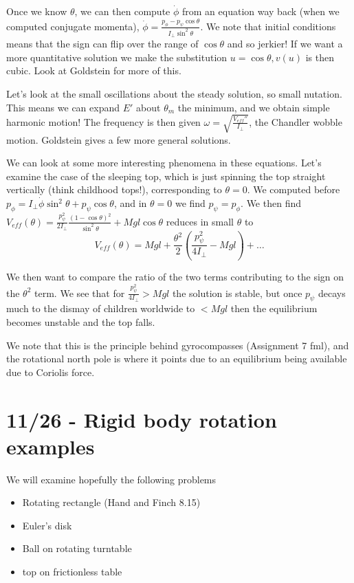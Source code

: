 \documentclass[10pt]{report}
\begin{document}
Once we know $\theta$, we can then compute $\dot{\phi}$ from an equation way back (when we computed conjugate momenta), $\dot{\phi} = \frac{p_\phi - p_\psi\cos \theta}{I_{\perp}\sin^2\theta}$. We note that initial conditions means that the sign can flip over the range of $\cos \theta$ and so jerkier! If we want a more quantitative solution we make the substitution $u = \cos \theta, v(u)$ is then cubic. Look at Goldstein for more of this.

Let's look at the small oscillations about the steady solution, so small nutation. This means we can expand $E'$ about $\theta_m$ the minimum, and we obtain simple harmonic motion! The frequency is then given $\omega = \sqrt{\frac{V_{eff}''}{I_\perp}}$, the Chandler wobble motion. Goldstein gives a few more general solutions.

We can look at some more interesting phenomena in these equations. Let's examine the case of the sleeping top, which is just spinning the top straight vertically (think childhood tops!), corresponding to $\theta = 0$. We computed before $p_\phi = I_\perp \dot{\phi}\sin^2\theta + p_\psi\cos \theta$, and in $\theta = 0$ we find $p_\psi = p_\phi$. We then find $V_{eff}(\theta) = \frac{p_\psi^2}{2I_{\perp}}\frac{(1-\cos\theta)^2}{\sin^2\theta} + Mgl\cos \theta$ reduces in small $\theta$ to
$$V_{eff}(\theta) = Mgl + \frac{\theta^2}{2}\left( \frac{p_\psi^2}{4I_\perp} - Mgl \right) +\dots$$

We then want to compare the ratio of the two terms contributing to the sign on the $\theta^2$ term. We see that for $\frac{p_\psi^2}{4I_\perp} > Mgl$ the solution is stable, but once $p_\psi$ decays much to the dismay of children worldwide to $< Mgl$ then the equilibrium becomes unstable and the top falls. 

We note that this is the principle behind gyrocompasses (Assignment 7 fml), and the rotational north pole is where it points due to an equilibrium being available due to Coriolis force. 

\chapter{11/26 - Rigid body rotation examples}

We will examine hopefully the following problems
\begin{itemize}
    \item Rotating rectangle (Hand and Finch 8.15)
    \item Euler's disk
    \item Ball on rotating turntable
    \item top on frictionless table
\end{itemize}
\end{document}
